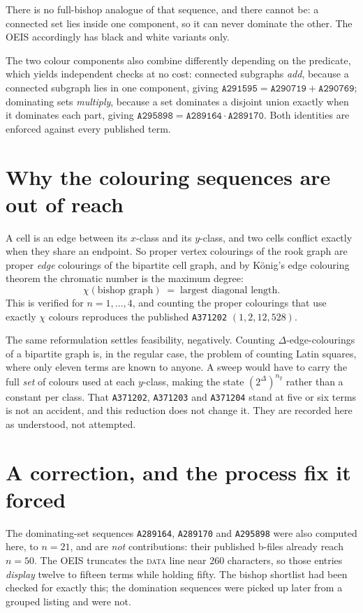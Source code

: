 \documentclass[11pt]{article}
\theoremstyle{remark}
\newcommand{\seq}[1]{\texttt{#1}}
\begin{document}
There is no full-bishop analogue of that sequence, and there cannot be: a
connected set lies inside one component, so it can never dominate the other. The
OEIS accordingly has black and white variants only.

The two colour components also combine differently depending on the predicate,
which yields independent checks at no cost: connected subgraphs \emph{add},
because a connected subgraph lies in one component, giving
$\seq{A291595} = \seq{A290719} + \seq{A290769}$; dominating sets
\emph{multiply}, because a set dominates a disjoint union exactly when it
dominates each part, giving $\seq{A295898} = \seq{A289164} \cdot \seq{A289170}$.
Both identities are enforced against every published term.

\section{Why the colouring sequences are out of reach}

A cell is an edge between its $x$-class and its $y$-class, and two cells conflict
exactly when they share an endpoint. So proper vertex colourings of the rook
graph are proper \emph{edge} colourings of the bipartite cell graph, and by
K\"onig's edge colouring theorem the chromatic number is the maximum degree:
\[
  \chi(\text{bishop graph}) \;=\; \text{largest diagonal length}.
\]
This is verified for $n = 1,\dots,4$, and counting the proper colourings that use
exactly $\chi$ colours reproduces the published \seq{A371202}
$(1, 2, 12, 528)$.

The same reformulation settles feasibility, negatively. Counting
$\Delta$-edge-colourings of a bipartite graph is, in the regular case, the
problem of counting Latin squares, where only eleven terms are known to anyone. A
sweep would have to carry the full \emph{set} of colours used at each $y$-class,
making the state $(2^{\Delta})^{n_y}$ rather than a constant per class. That
\seq{A371202}, \seq{A371203} and \seq{A371204} stand at five or six terms is not
an accident, and this reduction does not change it. They are recorded here as
understood, not attempted.

\section{A correction, and the process fix it forced}\label{sec:correction}

The dominating-set sequences \seq{A289164}, \seq{A289170} and \seq{A295898} were
also computed here, to $n=21$, and are \emph{not} contributions: their published
b-files already reach $n=50$. The OEIS truncates the \textsc{data} line near 260
characters, so those entries \emph{display} twelve to fifteen terms while holding
fifty. The bishop shortlist had been checked for exactly this; the domination
sequences were picked up later from a grouped listing and were not.
\end{document}
